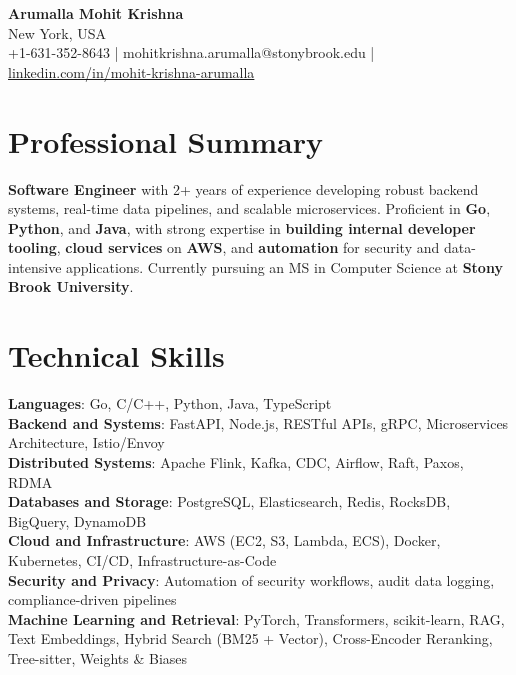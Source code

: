 \documentclass[letterpaper,11pt]{article}
\begin{document}
\begin{center}
  {\Large \textbf{Arumalla Mohit Krishna}} \\
  New York, USA \\
  +1-631-352-8643 \enspace | \enspace mohitkrishna.arumalla@stonybrook.edu \enspace | \enspace \href{https://www.linkedin.com/in/mohit-krishna-arumalla}{linkedin.com/in/mohit-krishna-arumalla}
\end{center}

\section{Professional Summary}
  \begin{itemize}[leftmargin=0.15in, label={}]
    \small{\item{
     \textbf{Software Engineer} with 2+ years of experience developing robust backend systems, real-time data pipelines, and scalable microservices. Proficient in \textbf{Go}, \textbf{Python}, and \textbf{Java}, with strong expertise in \textbf{building internal developer tooling}, \textbf{cloud services} on \textbf{AWS}, and \textbf{automation} for security and data-intensive applications. Currently pursuing an MS in Computer Science at \textbf{Stony Brook University}.
    }}
  \end{itemize}
\vspace{-16pt}

\section{Technical Skills}
 \begin{itemize}[leftmargin=0.15in, label={}]
    \small{\item{
     \textbf{Languages}: Go, C/C++, Python, Java, TypeScript \\
     \textbf{Backend and Systems}: FastAPI, Node.js, RESTful APIs, gRPC, Microservices Architecture, Istio/Envoy \\
     \textbf{Distributed Systems}: Apache Flink, Kafka, CDC, Airflow, Raft, Paxos, RDMA \\
     \textbf{Databases and Storage}: PostgreSQL, Elasticsearch, Redis, RocksDB, BigQuery, DynamoDB \\
     \textbf{Cloud and Infrastructure}: AWS (EC2, S3, Lambda, ECS), Docker, Kubernetes, CI/CD, Infrastructure-as-Code \\
     \textbf{Security and Privacy}: Automation of security workflows, audit data logging, compliance-driven pipelines \\
     \textbf{Machine Learning and Retrieval}: PyTorch, Transformers, scikit-learn, RAG, Text Embeddings, Hybrid Search (BM25 + Vector), Cross-Encoder Reranking, Tree-sitter, Weights \& Biases
    }}
 \end{itemize}
\vspace{-16pt}
\end{document}
